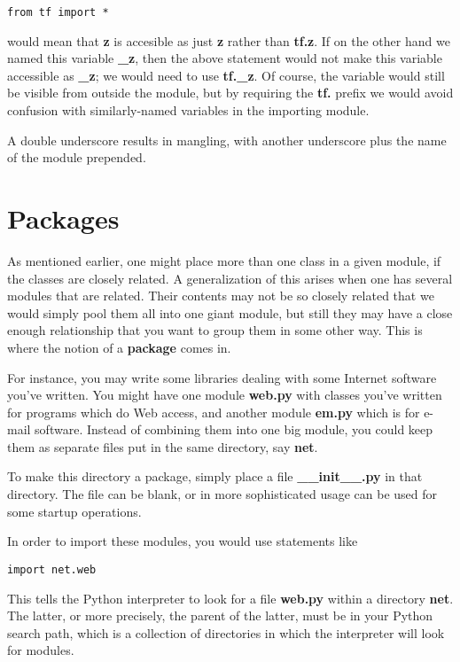 \begin{Verbatim}[fontsize=\relsize{-2}]
from tf import *
\end{Verbatim}

would mean that {\bf z} is accesible as just {\bf z} rather than {\bf
tf.z}.  If on the other hand we named this variable {\bf \_z}, then the
above statement would not make this variable accessible as {\bf \_z}; we
would need to use {\bf tf.\_z}.  Of course, the variable would still be
visible from outside the module, but by requiring the {\bf tf.} prefix
we would avoid confusion with similarly-named variables in the importing
module. 

A double underscore results in mangling, with another underscore plus
the name of the module prepended.

\section{Packages}

As mentioned earlier, one might place more than one class in a given
module, if the classes are closely related.  A generalization of this
arises when one has several modules that are related.  Their contents
may not be so closely related that we would simply pool them all into
one giant module, but still they may have a close enough relationship
that you want to group them in some other way.  This is where the notion
of a {\bf package} comes in.

For instance, you may write some libraries dealing with some Internet
software you've written.  You might have one module {\bf web.py} with
classes you've written for programs which do Web access, and another
module {\bf em.py} which is for e-mail software.  Instead of combining
them into one big module, you could keep them as separate files put in
the same directory, say {\bf net}.

To make this directory a package, simply place a file {\bf
\_\_init\_\_.py} in that directory.  The file can be blank, or in more
sophisticated usage can be used for some startup operations.

In order to import these modules, you would use statements like

\begin{Verbatim}[fontsize=\relsize{-2}]
import net.web
\end{Verbatim}

This tells the Python interpreter to look for a file {\bf web.py} within
a directory {\bf net}.  The latter, or more precisely, the parent of the
latter, must be in your Python search path, which is a collection of
directories in which the interpreter will look for modules.  

